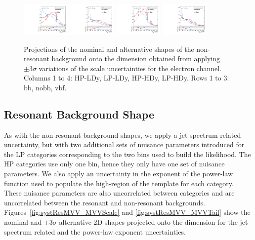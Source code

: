 \begin{figure}[htbp]
  \includegraphics[width=0.21\textwidth]{fig/uncertainties/systs_nonRes_e_HP_vbf_LDy_MJJScale_ProjY.pdf}
  \includegraphics[width=0.21\textwidth]{fig/uncertainties/systs_nonRes_e_LP_vbf_LDy_MJJScale_ProjY.pdf}
  \includegraphics[width=0.21\textwidth]{fig/uncertainties/systs_nonRes_e_HP_vbf_HDy_MJJScale_ProjY.pdf}
  \includegraphics[width=0.21\textwidth]{fig/uncertainties/systs_nonRes_e_LP_vbf_HDy_MJJScale_ProjY.pdf}\\
  \caption{
    Projections of the nominal and alternative shapes of the non-resonant background onto the \MJ dimension obtained from applying $\pm3\sigma$ variations of the \MJ scale uncertainties for the electron channel.
    Columns 1 to 4: HP-LDy, LP-LDy, HP-HDy, LP-HDy.
    Rows 1 to 3: bb, nobb, vbf.
  }
  \label{fig:systNonResMJ_MJJScale}
\end{figure}

\subsection{Resonant Background Shape}

As with the non-resonant background shapes, we apply a jet \pt spectrum related uncertainty, but with two additional sets of nuisance parameters introduced for the LP categories corresponding to the two \MJ bins used to build the \MVV likelihood.
The HP categories use only one \MJ bin, hence they only have one set of nuisance parameters.
We also apply an uncertainty in the exponent of the power-law function used to populate the high-\MVV region of the template for each category.
These nuisance parameters are also uncorrelated between categories and are uncorrelated between the resonant and non-resonant backgrounds.
Figures~\ref{fig:systResMVV_MVVScale} and \ref{fig:systResMVV_MVVTail} show the nominal and $\pm3\sigma$ alternative 2D shapes projected onto the \MVV dimension for the jet \pt spectrum related and the \MVV power-law exponent uncertainties.

